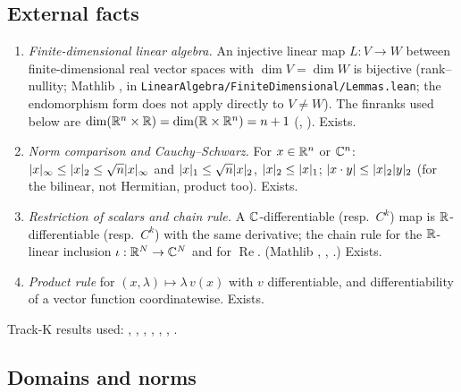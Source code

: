\subsection{External facts}\label{bpN:p1:s-ext}
\begin{enumerate}[label=(E\arabic*),leftmargin=2.2em]
\item\label{bpN:p1:ext-linalg} \emph{Finite-dimensional linear algebra.} An injective linear map $L:V\to W$ between finite-dimensional real vector spaces with $\dim V=\dim W$ is bijective
  (rank--nullity; Mathlib , in
  \texttt{LinearAlgebra/FiniteDimensional/Lemmas.lean}; the endomorphism form  does not apply directly to $V\ne W$).
  The finranks used below are $\dim(\mathbb{R}^n\times\mathbb{R})=\dim(\mathbb{R}\times\mathbb{R}^n)=n+1$ (, ). Exists.
\item\label{bpN:p1:ext-norms} \emph{Norm comparison and Cauchy--Schwarz.} For $x\in\mathbb{R}^n$ or $\mathbb{C}^n$: $\lvert x\rvert_\infty\le\lvert x\rvert_2\le\sqrt n\lvert x\rvert_\infty$ and
  $\lvert x\rvert_1\le\sqrt n\lvert x\rvert_2$, $\lvert x\rvert_2\le\lvert x\rvert_1$; $\lvert x\cdot y\rvert\le\lvert x\rvert_2\lvert y\rvert_2$ (for the bilinear, not Hermitian, product too). Exists.
\item\label{bpN:p1:ext-restrict} \emph{Restriction of scalars and chain rule.} A $\mathbb{C}$-differentiable (resp.\ $C^k$) map is $\mathbb{R}$-differentiable (resp.\ $C^k$) with the
  same derivative; the chain rule for the $\mathbb{R}$-linear inclusion $\iota:\mathbb{R}^N\to\mathbb{C}^N$ and for $\operatorname{Re}$. (Mathlib ,
  , .) Exists.
\item\label{bpN:p1:ext-prod} \emph{Product rule} for $(x,\lambda)\mapsto\lambda\,v(x)$ with $v$ differentiable, and differentiability of a vector function
  coordinatewise. Exists.
\end{enumerate}
Track-K results used: , , , ,
, , .

\subsection{Domains and norms}\label{bpN:p1:s-domains}

